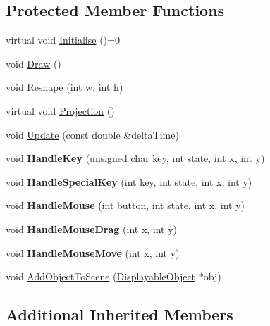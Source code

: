 \subsection*{Protected Member Functions}
\begin{DoxyCompactItemize}
\item 
virtual void \hyperlink{class_scene_ac97910ce8ed0aa0498a796d1cc7e0df5}{Initialise} ()=0
\item 
void \hyperlink{class_scene_a4813338ee7c6c995f5bb6f10e3673804}{Draw} ()
\item 
void \hyperlink{class_scene_a66107de97484c0f9a060e008cdc7320b}{Reshape} (int w, int h)
\item 
virtual void \hyperlink{class_scene_a6bf51e06c437c820c848be4c76c5ddae}{Projection} ()
\item 
void \hyperlink{class_scene_ab18f75e30620503fbfe2fb138116be5b}{Update} (const double \&delta\+Time)
\item 
void {\bfseries Handle\+Key} (unsigned char key, int state, int x, int y)\hypertarget{class_scene_a869ee0cb7f2b96b15ba6a7cce7e8358a}{}\label{class_scene_a869ee0cb7f2b96b15ba6a7cce7e8358a}

\item 
void {\bfseries Handle\+Special\+Key} (int key, int state, int x, int y)\hypertarget{class_scene_a8d878c181721d6dceac001de0ee73810}{}\label{class_scene_a8d878c181721d6dceac001de0ee73810}

\item 
void {\bfseries Handle\+Mouse} (int button, int state, int x, int y)\hypertarget{class_scene_a523a91aec3a7f546356dd0a06eb1d563}{}\label{class_scene_a523a91aec3a7f546356dd0a06eb1d563}

\item 
void {\bfseries Handle\+Mouse\+Drag} (int x, int y)\hypertarget{class_scene_a2265ef3985ed79dfa7f942b615fab3eb}{}\label{class_scene_a2265ef3985ed79dfa7f942b615fab3eb}

\item 
void {\bfseries Handle\+Mouse\+Move} (int x, int y)\hypertarget{class_scene_a43334d6db1ff83d24135aa566c318b6d}{}\label{class_scene_a43334d6db1ff83d24135aa566c318b6d}

\item 
void \hyperlink{class_scene_ab42e4830fe5baac28fa3e6d144492a82}{Add\+Object\+To\+Scene} (\hyperlink{class_displayable_object}{Displayable\+Object} $\ast$obj)
\end{DoxyCompactItemize}
\subsection*{Additional Inherited Members}


